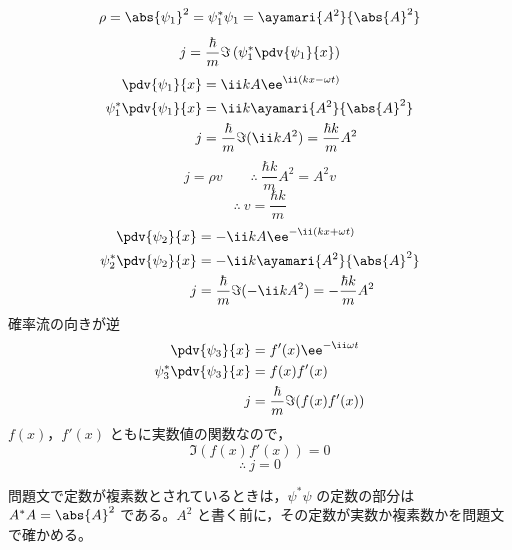 \[ \rho=\abs{\psi_{1}}^{2}=\psi_{1}^{*}\psi_{1}=\ayamari{A^{2}}{\abs{A}^{2}} \]
\[ j=\frac{\hbar}{m}\Im\left(\psi_{1}^{*}\pdv{\psi_{1}}{x}\right) \]
\begin{align*}
\pdv{\psi_{1}}{x}&=\ii kA\ee^{\ii(kx-\omega t)}\\
\psi_{1}^{*}\pdv{\psi_{1}}{x}&=\ii k\ayamari{A^{2}}{\abs{A}^{2}}\\
j&=\frac{\hbar}{m}\Im(\ii kA^{2})=\frac{\hbar k}{m}A^{2}
\end{align*}
\[ j=\rho v\qquad\therefore\ \frac{\hbar k}{m}A^{2}=A^{2}v \]
\[ \therefore\ v=\frac{\hbar k}{m} \]
\begin{align*}
\pdv{\psi_{2}}{x}&=-\ii kA\ee^{-\ii(kx+\omega t)}\\
\psi_{2}^{*}\pdv{\psi_{2}}{x}&=-\ii k\ayamari{A^{2}}{\abs{A}^{2}}\\
j&=\frac{\hbar}{m}\Im(-\ii kA^{2})=-\frac{\hbar k}{m}A^{2}
\end{align*}
確率流の向きが逆
\begin{align*}
\pdv{\psi_{3}}{x}&=f'(x)\ee^{-\ii\omega t}\\
\psi_{3}^{*}\pdv{\psi_{3}}{x}&=f(x)f'(x)\\
j&=\frac{\hbar}{m}\Im(f(x)f'(x))
\end{align*}
$f(x)$，$f'(x)$ ともに実数値の関数なので，
\[ \Im(f(x)f'(x))=0 \]
\[ \therefore\ j=0 \]
\item 問題文で定数が複素数とされているときは，$\psi^{*}\psi$ の定数の部分は $A^{*}A=\abs{A}^{2}$ である。$A^{2}$ と書く前に，その定数が実数か複素数かを問題文で確かめる。
